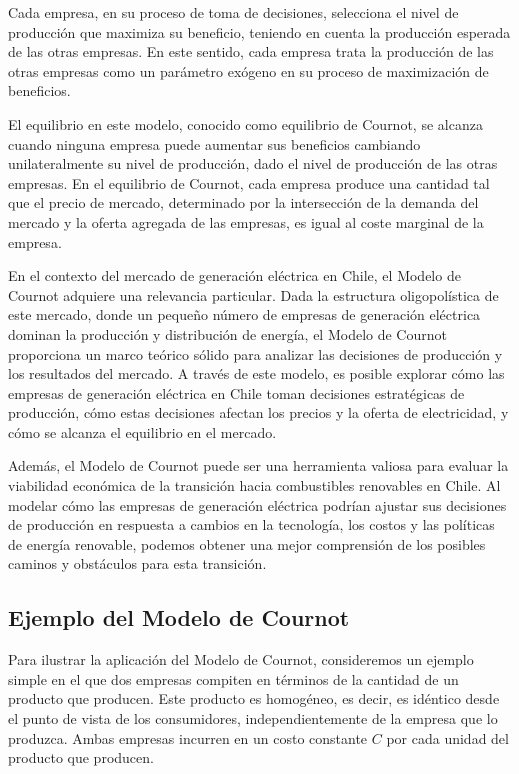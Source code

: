 Cada empresa, en su proceso de toma de decisiones, selecciona el nivel de producción que maximiza su beneficio, teniendo en cuenta la producción esperada de las otras empresas. En este sentido, cada empresa trata la producción de las otras empresas como un parámetro exógeno en su proceso de maximización de beneficios.
\vspace{2.5mm}

El equilibrio en este modelo, conocido como equilibrio de Cournot, se alcanza cuando ninguna empresa puede aumentar sus beneficios cambiando unilateralmente su nivel de producción, dado el nivel de producción de las otras empresas. En el equilibrio de Cournot, cada empresa produce una cantidad tal que el precio de mercado, determinado por la intersección de la demanda del mercado y la oferta agregada de las empresas, es igual al coste marginal de la empresa.
\vspace{2.5mm}

En el contexto del mercado de generación eléctrica en Chile, el Modelo de Cournot adquiere una relevancia particular. Dada la estructura oligopolística de este mercado, donde un pequeño número de empresas de generación eléctrica dominan la producción y distribución de energía, el Modelo de Cournot proporciona un marco teórico sólido para analizar las decisiones de producción y los resultados del mercado. A través de este modelo, es posible explorar cómo las empresas de generación eléctrica en Chile toman decisiones estratégicas de producción, cómo estas decisiones afectan los precios y la oferta de electricidad, y cómo se alcanza el equilibrio en el mercado.
\vspace{2.5mm}

Además, el Modelo de Cournot puede ser una herramienta valiosa para evaluar la viabilidad económica de la transición hacia combustibles renovables en Chile. Al modelar cómo las empresas de generación eléctrica podrían ajustar sus decisiones de producción en respuesta a cambios en la tecnología, los costos y las políticas de energía renovable, podemos obtener una mejor comprensión de los posibles caminos y obstáculos para esta transición.
\vspace{2.5mm}


\subsection{Ejemplo del Modelo de Cournot}\label{C263}
Para ilustrar la aplicación del Modelo de Cournot, consideremos un ejemplo simple en el que dos empresas compiten en términos de la cantidad de un producto que producen. Este producto es homogéneo, es decir, es idéntico desde el punto de vista de los consumidores, independientemente de la empresa que lo produzca. Ambas empresas incurren en un costo constante $C$ por cada unidad del producto que producen.
\vspace{2.5mm}

